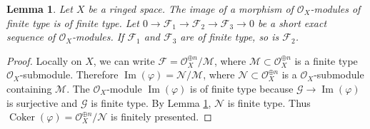 \documentclass[10pt,a4paper]{amsart}
\theoremstyle{plain}
\newtheorem{lemma}[subsection]{Lemma}
\theoremstyle{definition}
\theoremstyle{remark}
\numberwithin{equation}{subsection}
\def\Im{\mathop{\mathrm{Im}}}
\def\Coker{\mathop{\mathrm{Coker}}}
\begin{document}
\begin{lemma}
\label{lemma-extension-finite-type}
Let $X$ be a ringed space.
The image of a morphism of $\mathcal{O}_X$-modules of finite
type is of finite type.
Let
$0 \to \mathcal{F}_1 \to \mathcal{F}_2 \to \mathcal{F}_3 \to 0$
be a short exact sequence of $\mathcal{O}_X$-modules.
If $\mathcal{F}_1$ and $\mathcal{F}_3$ are of finite type,
so is $\mathcal{F}_2$.
\end{lemma}

\begin{proof}
Locally on $X$, we can write
$\mathcal{F} = \mathcal{O}_X^{\oplus n} / \mathcal{M}$, where
$\mathcal{M} \subset \mathcal{O}_X^{\oplus n}$ is a finite type
$\mathcal{O}_X$-submodule. Therefore
$\Im(\varphi) = \mathcal{N} / \mathcal{M}$, where
$\mathcal{N} \subset \mathcal{O}_X^{\oplus n}$ is a
$\mathcal{O}_X$-submodule containing $\mathcal{M}$.
The $\mathcal{O}_X$-module $\Im(\varphi)$ is of finite type
because $\mathcal{G} \to \Im(\varphi)$ is surjective and
$\mathcal{G}$ is finite type. By Lemma \ref{lemma-extension-finite-type},
$\mathcal{N}$ is finite type. Thus
$\Coker(\varphi) = \mathcal{O}_X^{\oplus n} / \mathcal{N}$
is finitely presented.
\end{proof}
\end{document}
